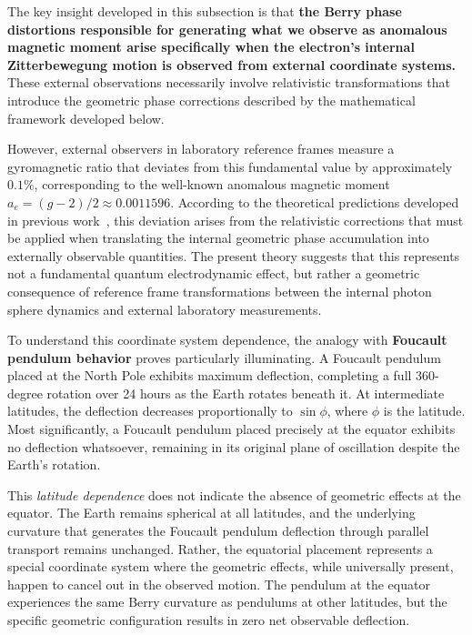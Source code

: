 \documentclass[%
 reprint,
 amsmath,amssymb,
 aps,
]{revtex4-1}
\numberwithin{equation}{section}%
\begin{document}
The key insight developed in this subsection is that \textbf{the Berry phase distortions responsible for generating what we observe as anomalous magnetic moment arise specifically when the electron's internal Zitterbewegung motion is observed from external coordinate systems.} These external observations necessarily involve relativistic transformations that introduce the geometric phase corrections described by the mathematical framework developed below.

However, external observers in laboratory reference frames measure a gyromagnetic ratio that deviates from this fundamental value by approximately $0.1\%$, corresponding to the well-known anomalous magnetic moment $a_e = (g-2)/2 \approx 0.0011596$. According to the theoretical predictions developed in previous work~\cite{hanamura2309.0047}, this deviation arises from the relativistic corrections that must be applied when translating the internal geometric phase accumulation into externally observable quantities. The present theory suggests that this represents not a fundamental quantum electrodynamic effect, but rather a geometric consequence of reference frame transformations between the internal photon sphere dynamics and external laboratory measurements.

To understand this coordinate system dependence, the analogy with \textbf{Foucault pendulum behavior} proves particularly illuminating. A Foucault pendulum placed at the North Pole exhibits maximum deflection, completing a full 360-degree rotation over 24 hours as the Earth rotates beneath it. At intermediate latitudes, the deflection decreases proportionally to $\sin\phi$, where $\phi$ is the latitude. Most significantly, a Foucault pendulum placed precisely at the equator exhibits no deflection whatsoever, remaining in its original plane of oscillation despite the Earth's rotation.

This \textit{latitude dependence} does not indicate the absence of geometric effects at the equator. The Earth remains spherical at all latitudes, and the underlying curvature that generates the Foucault pendulum deflection through parallel transport remains unchanged. Rather, the equatorial placement represents a special coordinate system where the geometric effects, while universally present, happen to cancel out in the observed motion. The pendulum at the equator experiences the same Berry curvature as pendulums at other latitudes, but the specific geometric configuration results in zero net observable deflection.
\end{document}
